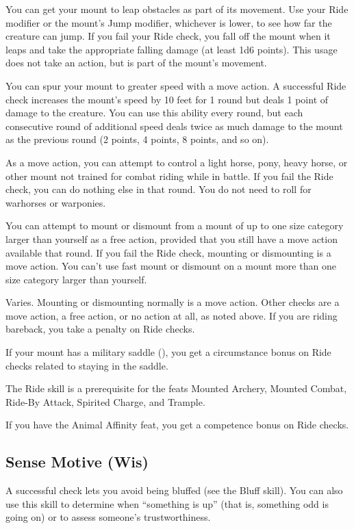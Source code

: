 You can get your mount to leap obstacles as part of its movement. Use your Ride modifier or the mount's Jump modifier, whichever is lower, to see how far the creature can jump. If you fail your Ride check, you fall off the mount when it leaps and take the appropriate falling damage (at least 1d6 points). This usage does not take an action, but is part of the mount's movement.

 You can spur your mount to greater speed with a move action. A successful Ride check increases the mount's speed by 10 feet for 1 round but deals 1 point of damage to the creature. You can use this ability every round, but each consecutive round of additional speed deals twice as much damage to the mount as the previous round (2 points, 4 points, 8 points, and so on).

 As a move action, you can attempt to control a light horse, pony, heavy horse, or other mount not trained for combat riding while in battle. If you fail the Ride check, you can do nothing else in that round. You do not need to roll for warhorses or warponies.

 You can attempt to mount or dismount from a mount of up to one size category larger than yourself as a free action, provided that you still have a move action available that round. If you fail the Ride check, mounting or dismounting is a move action. You can't use fast mount or dismount on a mount more than one size category larger than yourself.

 Varies. Mounting or dismounting normally is a move action. Other checks are a move action, a free action, or no action at all, as noted above.
 If you are riding bareback, you take a  penalty on Ride
checks.
\par If your mount has a military saddle (), you get a  circumstance bonus on Ride checks related to staying in the saddle.

The Ride skill is a prerequisite for the feats Mounted Archery, Mounted Combat, Ride-By Attack, Spirited Charge, and Trample.

If you have the Animal Affinity feat, you get a  competence bonus on Ride
checks.

\subsection{Sense Motive (Wis)}
 A successful check lets you avoid being bluffed (see the Bluff skill). You can also use this skill to determine when ``something is up'' (that is, something odd is going on) or to assess someone's trustworthiness.

